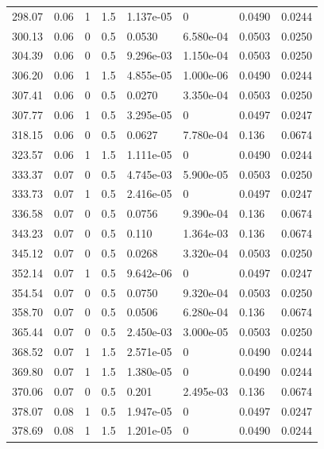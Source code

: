 \documentclass[preview]{standalone}
\begin{document}
{{{\begin{tabular}{L{1.2cm}C{1.2cm} C{0.3cm}C{0.5cm} C{1.4cm}C{1.4cm} C{1.4cm}C{1.4cm}}
  298.07  &  0.06  & 1     & 1.5 &  1.137e-05  & 0  & 0.0490 &  0.0244   \\ 
  300.13  &  0.06  & 0     & 0.5 &  0.0530  & 6.580e-04  & 0.0503 &  0.0250   \\ 
  304.39  &  0.06  & 0     & 0.5 &  9.296e-03  & 1.150e-04  & 0.0503 &  0.0250   \\ 
  306.20  &  0.06  & 1     & 1.5 &  4.855e-05  & 1.000e-06  & 0.0490 &  0.0244   \\ 
  307.41  &  0.06  & 0     & 0.5 &  0.0270  & 3.350e-04  & 0.0503 &  0.0250   \\ 
  307.77  &  0.06  & 1     & 0.5 &  3.295e-05  & 0  & 0.0497 &  0.0247   \\ 
  318.15  &  0.06  & 0     & 0.5 &  0.0627  & 7.780e-04  & 0.136 &  0.0674   \\ 
  323.57  &  0.06  & 1     & 1.5 &  1.111e-05  & 0  & 0.0490 &  0.0244   \\ 
  333.37  &  0.07  & 0     & 0.5 &  4.745e-03  & 5.900e-05  & 0.0503 &  0.0250   \\ 
  333.73  &  0.07  & 1     & 0.5 &  2.416e-05  & 0  & 0.0497 &  0.0247   \\ 
  336.58  &  0.07  & 0     & 0.5 &  0.0756  & 9.390e-04  & 0.136 &  0.0674   \\ 
  343.23  &  0.07  & 0     & 0.5 &  0.110  & 1.364e-03  & 0.136 &  0.0674   \\ 
  345.12  &  0.07  & 0     & 0.5 &  0.0268  & 3.320e-04  & 0.0503 &  0.0250   \\ 
  352.14  &  0.07  & 1     & 0.5 &  9.642e-06  & 0  & 0.0497 &  0.0247   \\ 
  354.54  &  0.07  & 0     & 0.5 &  0.0750  & 9.320e-04  & 0.0503 &  0.0250   \\ 
  358.70  &  0.07  & 0     & 0.5 &  0.0506  & 6.280e-04  & 0.136 &  0.0674   \\ 
  365.44  &  0.07  & 0     & 0.5 &  2.450e-03  & 3.000e-05  & 0.0503 &  0.0250   \\ 
  368.52  &  0.07  & 1     & 1.5 &  2.571e-05  & 0  & 0.0490 &  0.0244   \\ 
  369.80  &  0.07  & 1     & 1.5 &  1.380e-05  & 0  & 0.0490 &  0.0244   \\ 
  370.06  &  0.07  & 0     & 0.5 &  0.201  & 2.495e-03  & 0.136 &  0.0674   \\ 
  378.07  &  0.08  & 1     & 0.5 &  1.947e-05  & 0  & 0.0497 &  0.0247   \\ 
  378.69  &  0.08  & 1     & 1.5 &  1.201e-05  & 0  & 0.0490 &  0.0244   \\ 

\end{tabular}}}}
\end{document}
